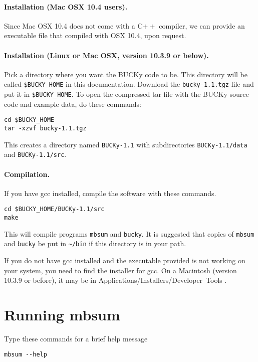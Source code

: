 \documentclass[12pt,english,final,letterpaper]{article}
\newcommand{\bu}{BUCKy}
\begin{document}
\paragraph{Installation (Mac OSX 10.4 users).}
Since Mac OSX 10.4 does not come with a C$++$ compiler, we can provide 
an executable file that compiled with OSX 10.4, upon request. 


\paragraph{Installation (Linux or Mac OSX, version 10.3.9 or below).}
Pick a directory where you want the \bu{} code to be. This directory 
will be called \verb+$BUCKY_HOME+ in this documentation.
Download the {\tt bucky-1.1.tgz} file and put it in \verb+$BUCKY_HOME+.
To open the compressed tar file with the \bu{} source code 
and example data, do these commands:
\begin{verbatim}
cd $BUCKY_HOME
tar -xzvf bucky-1.1.tgz
\end{verbatim}              %
This creates a directory named {\tt BUCKy-1.1} with subdirectories
{\tt BUCKy-1.1/data} and {\tt BUCKy-1.1/src}.

\paragraph{Compilation.} If you have gcc installed, compile
the software with these commands.
\begin{verbatim}
cd $BUCKY_HOME/BUCKy-1.1/src
make
\end{verbatim}   %
This will compile programs {\tt mbsum} and {\tt bucky}.
It is suggested that copies of {\tt mbsum} and {\tt bucky}
be put in \verb+~/bin+ if this directory is in your path.

If you do not have gcc installed and the executable provided
is not working on your system, you need to find the installer
for gcc. On a Macintosh (version 10.3.9 or before), it may be in 
Applications/Installers/Developer~Tools .

\section{Running mbsum}
Type these commands for a brief help message
\begin{verbatim}
mbsum --help
\end{verbatim}
\end{document}

